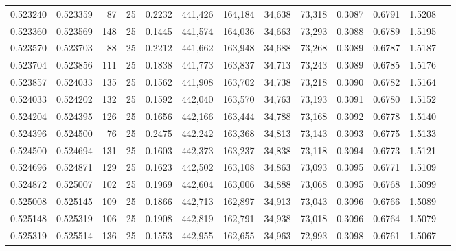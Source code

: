 \begin{tabular}{rrrrrrrrrrrrr}
0.523240 & 0.523359 &    87 &  25 &                                     0.2232 & 441,426 & 164,184 &  34,638 &  73,318 & 0.3087 & 0.6791 & 1.5208 \\
0.523360 & 0.523569 &   148 &  25 &                                     0.1445 & 441,574 & 164,036 &  34,663 &  73,293 & 0.3088 & 0.6789 & 1.5195 \\
0.523570 & 0.523703 &    88 &  25 &                                     0.2212 & 441,662 & 163,948 &  34,688 &  73,268 & 0.3089 & 0.6787 & 1.5187 \\
0.523704 & 0.523856 &   111 &  25 &                                     0.1838 & 441,773 & 163,837 &  34,713 &  73,243 & 0.3089 & 0.6785 & 1.5176 \\
0.523857 & 0.524033 &   135 &  25 &                                     0.1562 & 441,908 & 163,702 &  34,738 &  73,218 & 0.3090 & 0.6782 & 1.5164 \\
0.524033 & 0.524202 &   132 &  25 &                                     0.1592 & 442,040 & 163,570 &  34,763 &  73,193 & 0.3091 & 0.6780 & 1.5152 \\
0.524204 & 0.524395 &   126 &  25 &                                     0.1656 & 442,166 & 163,444 &  34,788 &  73,168 & 0.3092 & 0.6778 & 1.5140 \\
0.524396 & 0.524500 &    76 &  25 &                                     0.2475 & 442,242 & 163,368 &  34,813 &  73,143 & 0.3093 & 0.6775 & 1.5133 \\
0.524500 & 0.524694 &   131 &  25 &                                     0.1603 & 442,373 & 163,237 &  34,838 &  73,118 & 0.3094 & 0.6773 & 1.5121 \\
0.524696 & 0.524871 &   129 &  25 &                                     0.1623 & 442,502 & 163,108 &  34,863 &  73,093 & 0.3095 & 0.6771 & 1.5109 \\
0.524872 & 0.525007 &   102 &  25 &                                     0.1969 & 442,604 & 163,006 &  34,888 &  73,068 & 0.3095 & 0.6768 & 1.5099 \\
0.525008 & 0.525145 &   109 &  25 &                                     0.1866 & 442,713 & 162,897 &  34,913 &  73,043 & 0.3096 & 0.6766 & 1.5089 \\
0.525148 & 0.525319 &   106 &  25 &                                     0.1908 & 442,819 & 162,791 &  34,938 &  73,018 & 0.3096 & 0.6764 & 1.5079 \\
0.525319 & 0.525514 &   136 &  25 &                                     0.1553 & 442,955 & 162,655 &  34,963 &  72,993 & 0.3098 & 0.6761 & 1.5067 \\

\end{tabular}
